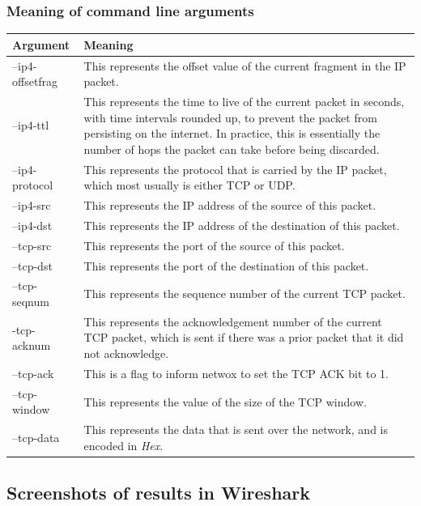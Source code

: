 \documentclass[12pt]{article}
\begin{document}
\subsubsection{Meaning of command line arguments}
\begin{table}[here]
\centering
\begin{tabularx}{\textwidth}{ | l | X | }
\hline
Argument			&	Meaning \\
\hline
--ip4-offsetfrag	& 	This represents the offset value of the current fragment in the IP packet. \\
\hline
--ip4-ttl			&	This represents the time to live of the current packet in seconds, with time intervals rounded up, to prevent the packet from persisting on the internet. In practice, this is essentially the number of hops the packet can take before being discarded. \\
\hline
--ip4-protocol		&	This represents the protocol that is carried by the IP packet, which most usually is either TCP or UDP. \\
\hline
--ip4-src			& 	This represents the IP address of the source of this packet. \\
\hline
--ip4-dst			& 	This represents the IP address of the destination of this packet. \\
\hline
--tcp-src			&	This represents the port of the source of this packet. \\
\hline
--tcp-dst			& 	This represents the port of the destination of this packet. \\
\hline
--tcp-seqnum		&	This represents the sequence number of the current TCP packet. \\
\hline
-tcp-acknum			& 	This represents the acknowledgement number of the current TCP packet, which is sent if there was a prior packet that it did not acknowledge. \\
\hline
--tcp-ack 			& 	This is a flag to inform netwox to set the TCP ACK bit to 1. \\
\hline
--tcp-window		& 	This represents the value of the size of the TCP window. \\
\hline
--tcp-data			& 	This represents the data that is sent over the network, and is encoded in \emph{Hex}. \\
\hline
\end{tabularx}
\end{table}

\subsection{Screenshots of results in Wireshark}
\end{document}

